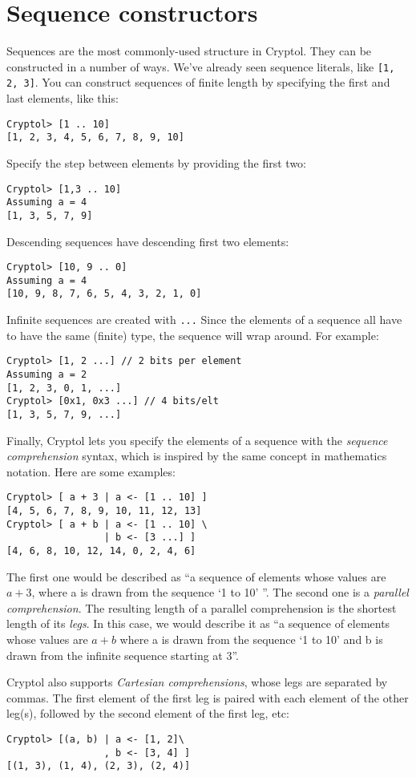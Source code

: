 \documentclass[9pt,letter]{article}
\begin{document}
\section{Sequence constructors}
Sequences are the most commonly-used
structure in Cryptol. They can be constructed in a number of ways. We've already seen sequence literals, like \verb+[1, 2, 3]+.
You can construct sequences of finite length by specifying the first and last elements, like this:
\begin{verbatim}
Cryptol> [1 .. 10]
[1, 2, 3, 4, 5, 6, 7, 8, 9, 10]
\end{verbatim}
Specify the step between elements by providing the first two:
\begin{verbatim}
Cryptol> [1,3 .. 10]
Assuming a = 4
[1, 3, 5, 7, 9]
\end{verbatim}
Descending sequences have descending first two elements:
\begin{verbatim}
Cryptol> [10, 9 .. 0]
Assuming a = 4
[10, 9, 8, 7, 6, 5, 4, 3, 2, 1, 0]
\end{verbatim}
Infinite sequences are created with \verb+...+ Since the elements of a sequence all have to have the same (finite) type, the sequence will wrap around.  For example:
\begin{verbatim}
Cryptol> [1, 2 ...] // 2 bits per element
Assuming a = 2
[1, 2, 3, 0, 1, ...]
Cryptol> [0x1, 0x3 ...] // 4 bits/elt
[1, 3, 5, 7, 9, ...]
\end{verbatim}
Finally, Cryptol lets you specify the elements of a sequence with the {\it sequence comprehension} syntax, which is inspired by the same concept in mathematics notation. Here are some examples:
\begin{verbatim}
Cryptol> [ a + 3 | a <- [1 .. 10] ] 
[4, 5, 6, 7, 8, 9, 10, 11, 12, 13]
Cryptol> [ a + b | a <- [1 .. 10] \
                 | b <- [3 ...] ] 
[4, 6, 8, 10, 12, 14, 0, 2, 4, 6]
\end{verbatim}
The first one would be described as ``a sequence of elements whose values are $a + 3$, where a is drawn from the sequence `1 to 10' ''. The second one is a {\it parallel comprehension}. The resulting length of a parallel comprehension is the shortest length of its {\it legs}. In this case, we would describe it as ``a sequence of elements whose values are $a + b$ where a is drawn from the sequence `1 to 10' and b is drawn from the infinite sequence starting at 3''.

Cryptol also supports {\it Cartesian comprehensions}, whose legs are separated by commas. The first element of the first leg is paired with each element of the other leg(s), followed by the second element of the first leg, etc:
\begin{verbatim}
Cryptol> [(a, b) | a <- [1, 2]\
                 , b <- [3, 4] ] 
[(1, 3), (1, 4), (2, 3), (2, 4)]
\end{verbatim}
\end{document}
